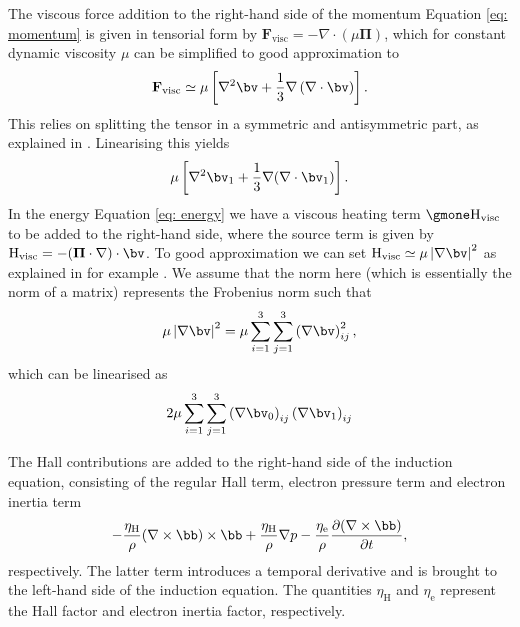 The viscous force addition to the right-hand side of the momentum Equation \eqref{eq: momentum} is given in tensorial form by $\mathbf{F}_{\mathrm{visc}} = -\nabla\cdot\left(\mu\mathbf{\Pi}\right)$, which for constant dynamic viscosity $\mu$ can be simplified to good approximation to
\begin{equation}
	\mathbf{F}_{\mathrm{visc}} \simeq \mu \left[ \nabla^2\bv + \frac{1}{3} \nabla\left(\nabla\cdot\bv\right)\right].
\end{equation}
This relies on splitting the tensor in a symmetric and antisymmetric part, as explained in \citet{porth2014_amrvac}. Linearising this yields
\begin{equation}
  \mu\left[\nabla^2\bv_1 + \frac{1}{3}\nabla(\nabla \cdot \bv_1)\right].
\end{equation}
In the energy Equation \eqref{eq: energy} we have a viscous heating term $\gmone\text{H}_\text{visc}$ to be added to the right-hand side, where the source term is given by $\text{H}_\text{visc} = -(\boldsymbol{\Pi} \cdot \nabla) \cdot \bv$. To good approximation we can set $\text{H}_\text{visc} \simeq \mu \left|\nabla \bv\right|^2$ as explained in for example \citet{book_MHD}. We assume that the norm here (which is essentially the norm of a matrix) represents the Frobenius norm such that
\begin{equation}
  \mu\left|\nabla \bv\right|^2 = \mu\sum_{i=1}^{3}\sum_{j=1}^{3}\left(\nabla \bv\right)_{ij}^2,
\end{equation}
which can be linearised as
\begin{equation}
  2\mu\sum_{i=1}^{3}\sum_{j=1}^{3}\left(\nabla \bv_0\right)_{ij}\left(\nabla \bv_1\right)_{ij}
\end{equation}

The Hall contributions are added to the right-hand side of the induction equation, consisting of the regular Hall term, electron pressure term and electron inertia term
\begin{equation}
  -\frac{\eta_\text{H}}{\rho}(\nabla \times \bb) \times \bb
  + \frac{\eta_\text{H}}{\rho}\nabla p
  - \frac{\eta_\text{e}}{\rho}\frac{\partial (\nabla \times \bb)}{\partial t},
\end{equation}
respectively. The latter term introduces a temporal derivative and is brought to the left-hand side of the induction equation. The quantities $\eta_\text{H}$ and $\eta_\text{e}$ represent the Hall factor and electron inertia factor, respectively.




